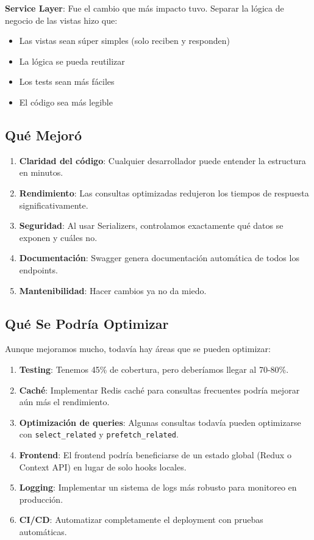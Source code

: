 \textbf{Service Layer}: Fue el cambio que más impacto tuvo. Separar la lógica de negocio de las vistas hizo que:
\begin{itemize}
    \item Las vistas sean súper simples (solo reciben y responden)
    \item La lógica se pueda reutilizar
    \item Los tests sean más fáciles
    \item El código sea más legible
\end{itemize}

\subsection{Qué Mejoró}

\begin{enumerate}
    \item \textbf{Claridad del código}: Cualquier desarrollador puede entender la estructura en minutos.
    \item \textbf{Rendimiento}: Las consultas optimizadas redujeron los tiempos de respuesta significativamente.
    \item \textbf{Seguridad}: Al usar Serializers, controlamos exactamente qué datos se exponen y cuáles no.
    \item \textbf{Documentación}: Swagger genera documentación automática de todos los endpoints.
    \item \textbf{Mantenibilidad}: Hacer cambios ya no da miedo.
\end{enumerate}

\subsection{Qué Se Podría Optimizar}

Aunque mejoramos mucho, todavía hay áreas que se pueden optimizar:

\begin{enumerate}
    \item \textbf{Testing}: Tenemos 45\% de cobertura, pero deberíamos llegar al 70-80\%.
    \item \textbf{Caché}: Implementar Redis caché para consultas frecuentes podría mejorar aún más el rendimiento.
    \item \textbf{Optimización de queries}: Algunas consultas todavía pueden optimizarse con \texttt{select\_related} y \texttt{prefetch\_related}.
    \item \textbf{Frontend}: El frontend podría beneficiarse de un estado global (Redux o Context API) en lugar de solo hooks locales.
    \item \textbf{Logging}: Implementar un sistema de logs más robusto para monitoreo en producción.
    \item \textbf{CI/CD}: Automatizar completamente el deployment con pruebas automáticas.
\end{enumerate}

